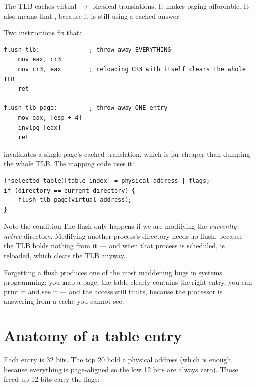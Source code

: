 The TLB caches virtual $\rightarrow$ physical translations. It makes paging affordable. It also
means that , because it is still
using a cached answer.

Two instructions fix that:

\begin{lstlisting}[style=asm]
flush_tlb:              ; throw away EVERYTHING
    mov eax, cr3
    mov cr3, eax        ; reloading CR3 with itself clears the whole TLB
    ret

flush_tlb_page:         ; throw away ONE entry
    mov eax, [esp + 4]
    invlpg [eax]
    ret
\end{lstlisting}

 invalidates a single page's cached translation, which is far cheaper than dumping the
whole TLB. The mapping code uses it:

\begin{lstlisting}[style=c]
(*selected_table)[table_index] = physical_address | flags;
if (directory == current_directory) {
    flush_tlb_page(virtual_address);
}
\end{lstlisting}

\begin{warn}{Note the condition}
The flush only happens if we are modifying the \emph{currently active} directory. Modifying another
process's directory needs no flush, because the TLB holds nothing from it --- and when that process
is scheduled,  is reloaded, which clears the TLB anyway.

Forgetting a flush produces one of the most maddening bugs in systems programming: you map a page,
the table clearly contains the right entry, you can print it and see it --- and the access still
faults, because the processor is answering from a cache you cannot see.
\end{warn}

\section{Anatomy of a table entry}

Each entry is 32 bits. The top 20 hold a physical address (which is enough, because everything is
page-aligned so the low 12 bits are always zero). Those freed-up 12 bits carry the flags:

\begin{center}
\end{center}

